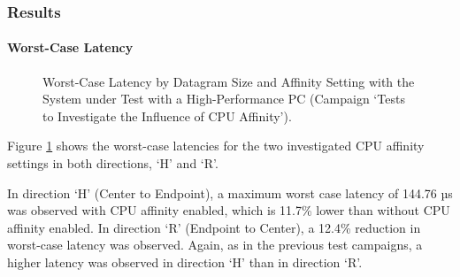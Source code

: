 \subsubsection{Results}
\paragraph{Worst-Case Latency}

\begin{figure}[h!]
  \centering
  \caption{Worst-Case Latency by Datagram Size and Affinity Setting with the System under Test with a High-Performance PC (Campaign `Tests to Investigate the Influence of \ac{CPU} Affinity').}
  \label{fig:AffWc}
\end{figure}

Figure \ref{fig:AffWc} shows the worst-case latencies for the two investigated \ac{CPU} affinity settings in both directions, `H' and `R'.

In direction `H' (Center to Endpoint), a maximum worst case latency of 144.76 µs was observed with \ac{CPU} affinity enabled, which is 11.7\% lower than without \ac{CPU} affinity enabled. In direction `R' (Endpoint to Center), a 12.4\% reduction in worst-case latency was observed. Again, as in the previous test campaigns, a higher latency was observed in direction `H' than in direction `R'.

